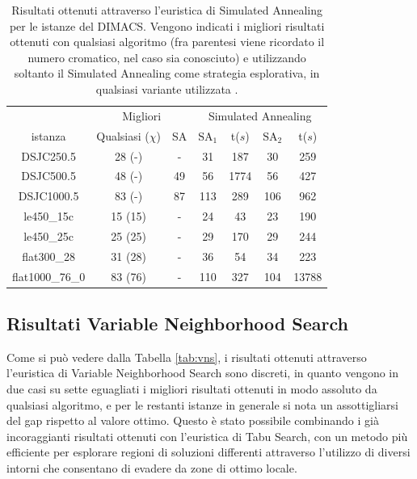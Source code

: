\documentclass[a4paper,10pt]{article}
\begin{document}
\begin{table}[h]
\begin{center}
\begin{tabular}{|c|c|c||c|c|c|c|}
\hline
                & \multicolumn{2}{c||}{Migliori} & \multicolumn{4}{c|}{Simulated Annealing} \\
\cline{2-7}
istanza         &Qualsiasi ($\chi$)    &SA  &$\textrm{SA}_{1}$ &t($s$)     &$\textrm{SA}_{2}$  &t($s$)\\
\hline
DSJC250.5       & 28 (-)               &-   &31        &187        &30             &259 \\
DSJC500.5       & 48 (-)               &49  &56        &1774       &56             &427 \\
DSJC1000.5      & 83 (-)               &87  &113       &289        &106            &962 \\
le450\_15c      & 15 (15)              &-   &24        &43         &23             &190 \\
le450\_25c      & 25 (25)              &-   &29        &170        &29             &244 \\
flat300\_28     & 31 (28)              &-   &36        &54         &34             &223 \\
flat1000\_76\_0 & 83 (76)              &-   &110       &327        &104            &13788\\
\hline
\end{tabular}
\caption{Risultati ottenuti attraverso l'euristica di Simulated Annealing per le istanze del DIMACS. Vengono indicati i migliori risultati ottenuti con qualsiasi algoritmo (fra parentesi viene ricordato il numero cromatico, nel caso sia conosciuto) e utilizzando soltanto il Simulated Annealing come strategia esplorativa, in qualsiasi variante utilizzata \cite{sa_johnson}.}
\label{tab:sa}
\end{center}
\end{table}

\subsection{Risultati Variable Neighborhood Search}
Come si può vedere dalla Tabella \ref{tab:vns}, i risultati ottenuti attraverso l'euristica di Variable Neighborhood Search sono discreti, in quanto vengono in due casi su sette eguagliati i migliori risultati ottenuti in modo assoluto da qualsiasi algoritmo, e per le restanti istanze in generale si nota un assottigliarsi del gap rispetto al valore ottimo. Questo è stato possibile combinando i già incoraggianti risultati ottenuti con l'euristica di Tabu Search, con un metodo più efficiente per esplorare regioni di soluzioni differenti attraverso l'utilizzo di diversi intorni che consentano di evadere da zone di ottimo locale.
\end{document}

